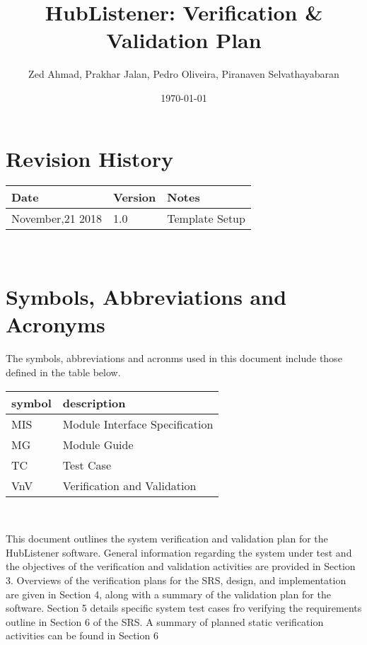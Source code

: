 \documentclass[12pt, titlepage]{article}
\begin{document}
\title{HubListener: Verification \& Validation Plan} 
\author{Zed Ahmad, Prakhar Jalan, Pedro Oliveira, Piranaven Selvathayabaran}
\date{\today}
	
\maketitle


\section{Revision History}

\begin{tabularx}{\textwidth}{p{3cm}p{2cm}X}
\toprule {\bf Date} & {\bf Version} & {\bf Notes}\\
\midrule
November,21 2018 & 1.0 & Template Setup\\
\bottomrule
\end{tabularx}

~\newpage

\section{Symbols, Abbreviations and Acronyms}

The symbols, abbreviations and acronms used in this document include those defined in the table below. \newline
\renewcommand{\arraystretch}{1.2}

\begin{tabular}{l l} 
  \toprule		
  \textbf{symbol} & \textbf{description}\\
  \midrule 
  MIS & Module Interface Specification\\
  MG & Module Guide \\
  TC & Test Case \\
  VnV & Verification and Validation\\
  \bottomrule
\end{tabular}\\


\newpage

\tableofcontents

\listoftables %

\listoffigures %

\newpage


This document outlines the system verification and validation plan for the HubListener software. General information regarding the system under test and the objectives of the verification and validation activities are provided in Section 3.  Overviews of the verification plans for the SRS, design, and implementation are given in Section 4, along with a summary of the validation plan for the software. Section 5 details specific system test cases fro verifying the requirements outline in Section 6 of the SRS. A summary of planned static verification activities can be found in Section 6 
\end{document}
